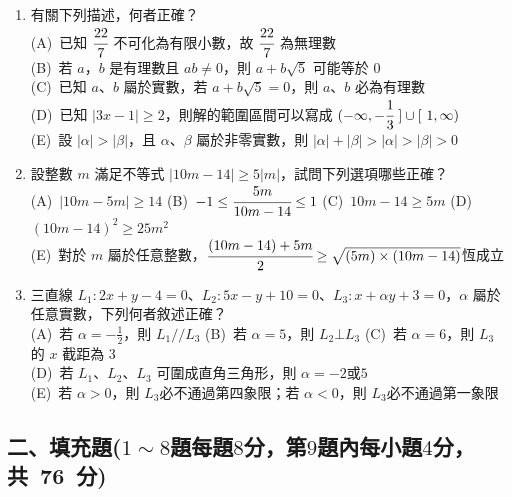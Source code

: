 \documentclass[b4paper,12pt]{exam}
\begin{document}
\begin{enumerate}[itemsep=0.5em, topsep=1em]\setcounter{enumi}{0}
    \item 有關下列描述，何者正確？\\[0.5em]
        (A)~{已知 $\cfrac{22}{7}$ 不可化為有限小數，故 $\cfrac{22}{7}$ 為無理數}\\[0.6em]
        (B)~{若 $a$，$b$ 是有理數且 $ab\neq0$，則 $a+b\sqrt{5}$ 可能等於 $0$}\\[0.6em]
        (C)~{已知 $a$、$b$ 屬於實數，若 $a+b\sqrt{5}=0$，則 $a$、$b$ 必為有理數}\\[0.6em]
        (D)~{已知 $|3x-1|\geq2$，則解的範圍區間可以寫成 $ (-\infty , -\cfrac{1}{3}\ ] \cup [\ 1,\infty) $}\\[0.6em]
        (E)~{設 $|\alpha|>|\beta|$，且 $\alpha$、$\beta$ 屬於非零實數，則 $|\alpha|+|\beta| > |\alpha| > |\beta| > 0$}\\

    \item 設整數 $m$ 滿足不等式 $|10m-14|\geq 5|m|$，試問下列選項哪些正確？\\[.4em]
        (A)~{$|10m-5m|\geq14$}\hspace{2em}
        (B)~{$-1\leq\cfrac{5m}{10m-14}\leq1$}\hspace{2em}
        (C)~{$10m-14\geq5m$}\hspace{2em}
        (D)~{$(10m-14)^2\geq25m^2$}\\[0.6em]
        (E)~{對於 $m$ 屬於任意整數，$\cfrac{(10m-14)+5m}{2}\geq\sqrt{(5m)\times(10m-14)}$}恆成立
        
    \item 三直線 $L_1:2x+y-4=0$、$L_2:5x-y+10=0$、$L_3:x+\alpha y+3=0$，$\alpha$ 屬於任意實數，下列何者敘述正確？\\[0.6em]
        (A)~{若 $\alpha=-\frac{1}{2}$，則 $L_1//L_3$}\hspace{4em}
        (B)~{若 $\alpha=5$，則 $L_2\bot L_3$}\hspace{4em}
        (C)~{若 $\alpha=6$，則 $L_3$ 的 $x$ 截距為 $3$}\\[0.6em]
        (D)~{若 $L_1$、$L_2$、$L_3$ 可圍成直角三角形，則 $\alpha=-2$或$5$}\\[0.6em]
        (E)~{若 $\alpha>0$，則 $L_3$必不通過第四象限；若 $\alpha<0$，則 $L_3$必不通過第一象限}
        
\end{enumerate}

\subsection*{二、填充題($1\sim8$題每題$8$分，第$9$題內每小題$4$分，共\ 76\ 分)}
\end{document}
